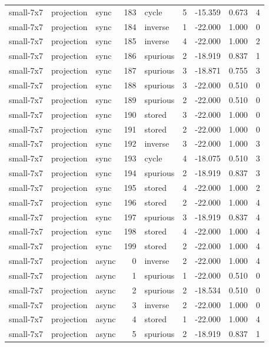 \begin{tabular}{lllrlrrrr}
small-7x7 & projection & sync & 183 & cycle & 5 & -15.359 & 0.673 & 4 \\
small-7x7 & projection & sync & 184 & inverse & 1 & -22.000 & 1.000 & 0 \\
small-7x7 & projection & sync & 185 & inverse & 4 & -22.000 & 1.000 & 2 \\
small-7x7 & projection & sync & 186 & spurious & 2 & -18.919 & 0.837 & 1 \\
small-7x7 & projection & sync & 187 & spurious & 3 & -18.871 & 0.755 & 3 \\
small-7x7 & projection & sync & 188 & spurious & 3 & -22.000 & 0.510 & 0 \\
small-7x7 & projection & sync & 189 & spurious & 2 & -22.000 & 0.510 & 0 \\
small-7x7 & projection & sync & 190 & stored & 3 & -22.000 & 1.000 & 0 \\
small-7x7 & projection & sync & 191 & stored & 2 & -22.000 & 1.000 & 0 \\
small-7x7 & projection & sync & 192 & inverse & 3 & -22.000 & 1.000 & 3 \\
small-7x7 & projection & sync & 193 & cycle & 4 & -18.075 & 0.510 & 3 \\
small-7x7 & projection & sync & 194 & spurious & 2 & -18.919 & 0.837 & 3 \\
small-7x7 & projection & sync & 195 & stored & 4 & -22.000 & 1.000 & 2 \\
small-7x7 & projection & sync & 196 & stored & 2 & -22.000 & 1.000 & 4 \\
small-7x7 & projection & sync & 197 & spurious & 3 & -18.919 & 0.837 & 4 \\
small-7x7 & projection & sync & 198 & stored & 4 & -22.000 & 1.000 & 4 \\
small-7x7 & projection & sync & 199 & stored & 2 & -22.000 & 1.000 & 4 \\
small-7x7 & projection & async & 0 & inverse & 2 & -22.000 & 1.000 & 4 \\
small-7x7 & projection & async & 1 & spurious & 1 & -22.000 & 0.510 & 0 \\
small-7x7 & projection & async & 2 & spurious & 2 & -18.534 & 0.510 & 0 \\
small-7x7 & projection & async & 3 & inverse & 2 & -22.000 & 1.000 & 0 \\
small-7x7 & projection & async & 4 & stored & 1 & -22.000 & 1.000 & 4 \\
small-7x7 & projection & async & 5 & spurious & 2 & -18.919 & 0.837 & 1 \\

\end{tabular}

